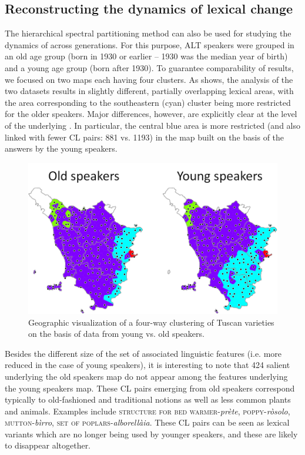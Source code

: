 \documentclass[output=paper]{LSP/langsci}
\begin{document}
\subsection{Reconstructing the dynamics of lexical change}
The hierarchical spectral partitioning method can also be used for studying the dynamics of  across generations. For this purpose, ALT speakers were grouped in an old age group (born in 1930 or earlier – 1930 was the median year of birth) and a young age group (born after 1930). To guarantee comparability of results, we focused on two maps each having four clusters. As  shows, the analysis of the two datasets results in slightly different, partially overlapping lexical areas, with the area corresponding to the southeastern (cyan) cluster being more restricted for the older speakers. Major differences, however, are explicitly clear at the level of the underlying . In particular, the central blue area is more restricted (and also linked with fewer CL pairs: 881 vs. 1193) in the map built on the basis of the answers by the young speakers. 


\begin{figure}[t]
\includegraphics[width=.7\textwidth]{illustrations/monte_wiel_fig4} 
\caption{Geographic visualization of a four-way clustering of Tuscan varieties on the basis of data from young vs. old speakers.}
\label{fig:monte:4}
\end{figure}

Besides the different size of the set of associated linguistic features (i.e. more reduced in the case of young speakers), it is interesting to note that 424 salient  underlying the old speakers map do not appear among the features underlying the young speakers map. These CL pairs emerging from old speakers correspond typically to old-fashioned and traditional notions as well as less common plants and animals. Examples include \textsc{structure for bed warmer}{}-\textit{prète}, \textsc{poppy}{}-\textit{ròsolo}, \textsc{mutton}{}-\textit{bìrro}, \textsc{set of poplars}{}-\textit{alborellàia}. These CL pairs can be seen as lexical variants which are no longer being used by younger speakers, and these are likely to disappear altogether. 
\end{document}
